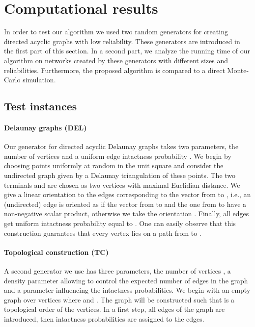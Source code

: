\documentclass{article}
\begin{document}
\section{Computational results}\label{sec:computational_results}

In order to test our algorithm we used two random generators for
creating directed acyclic graphs with low reliability. These generators are introduced in
the first part of this section. In a second part, we analyze the
running time of our algorithm on networks created by these
generators with different sizes and reliabilities.
Furthermore, the proposed algorithm is compared to a
direct \mbox{Monte-Carlo} simulation.

\subsection{Test instances}


\paragraph{Delaunay graphs (DEL)}

Our generator for directed acyclic Delaunay graphs takes two parameters, the number of
vertices  and a uniform edge intactness probability .
We begin by choosing  points uniformly at random in the unit square and consider the
undirected graph given by a Delaunay triangulation of these points. The two
terminals  and  are chosen as two vertices with maximal Euclidian
distance. We give a linear orientation to the edges corresponding to
the vector from  to , i.e., an (undirected) edge  is oriented
as  if the vector from  to  and the one from  to  have
a \mbox{non-negative} scalar product, otherwise we take the orientation .
Finally, all edges get uniform intactness probability equal to .
One can easily observe that this construction guarantees that every vertex lies
on a path from  to .



\paragraph{Topological construction (TC)}

A second generator we use has three parameters, the number of vertices
, a density parameter  allowing to control the
expected number of edges in the graph and a parameter  influencing
the intactness probabilities. We begin with an empty
graph over  vertices  where  and .
The graph will be constructed such that  is a topological
order of the vertices. In a first step, all edges of the graph are introduced,
then intactness probabilities are assigned to the edges.
\end{document}
